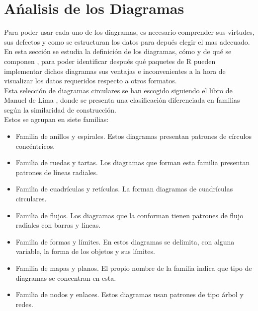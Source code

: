\documentclass{article}\usepackage[]{graphicx}\usepackage[]{color}
\begin{document}
\section{A\'nalisis de los Diagramas}\label{sec:Analisis}
Para poder usar cada uno de los diagramas, es necesario comprender sus virtudes, sus defectos y como se estructuran los datos para depu\'es elegir el mas adecuado.~\\
En esta secci\'on se estudia la definici\'on de los diagramas, c\'omo y de qu\'e se componen , para poder identificar despu\'es qu\'e paquetes de R pueden implementar dichos diagramas sus ventajas e inconvenientes a la hora de visualizar los datos requeridos respecto a otros formatos.~\\
Esta selecci\'on de diagramas circulares se han escogido siguiendo el libro de Manuel de Lima \cite{Circle}
, donde se presenta una clasificaci\'on diferenciada en familias seg\'un la similaridad de construcci\'on.~\\ Estos se agrupan en siete familias:
\begin{itemize}
\item Familia de anillos y espirales. Estos diagramas presentan patrones de c\'irculos conc\'entricos.
\item Familia de ruedas y tartas. Los diagramas que forman esta familia presentan patrones de l\'ineas radiales.
\item Familia de cuadr\'iculas y ret\'iculas. La forman diagramas de cuadr\'iculas circulares.
\item Familia de flujos. Los diagramas que la conforman tienen patrones de flujo radiales con barras y l\'ineas.
\item Familia de formas y l\'imites. En estos diagramas se delimita, con alguna variable, la forma de los objetos y sus l\'imites.
\item Familia de mapas y planos. El propio nombre de la familia indica que tipo de diagramas se concentran en esta.
\item Familia de nodos y enlaces. Estos diagramas usan patrones de tipo \'arbol y redes.
\end{itemize}
\end{document}
